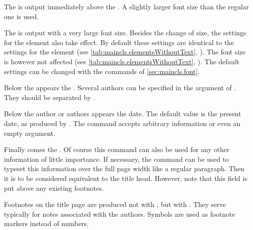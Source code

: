 The  is output immediately
above the . A slightly larger font size than the regular
one is used.

The  is output with a very large font size.
Besides the change
of size, the settings for the element
 also take effect. By
default these settings are identical to the settings for the element
 (see
\autoref{tab:maincls.elementsWithoutText},
). The font size is however
not affected (see \autoref{tab:maincls.elementsWithoutText},
). The
default settings can be changed with the commands of
\autoref{sec:maincls.font}.

Below the  appears the
.  Several authors can be
specified in the argument of . They should be separated
by .

Below the author or authors appears the date. The default
value is the present date, as produced by
. The  command accepts
arbitrary information or even an empty argument.

Finally comes the . Of
course this command can also be used for any other information of
little importance. If necessary, the  command can be
used to typeset this information over the full page width like a
regular paragraph.  Then it is to be considered equivalent to the
title head. However, note that this field is put above any existing
footnotes.

Footnotes on the title page are produced not with
, but with . They serve typically for
notes associated with the authors. Symbols are used as footnote
markers instead of numbers.

